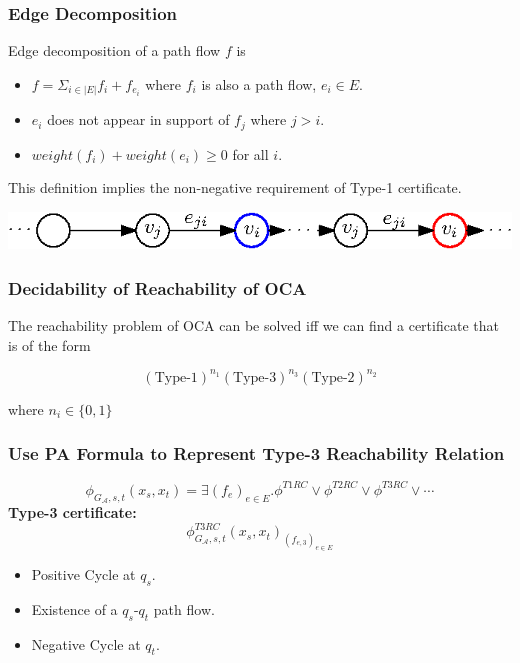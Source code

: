 \documentclass[11pt]{beamer}
\begin{document}
\begin{frame}\frametitle{Edge Decomposition}

\begin{definition}
Edge decomposition of a path flow $f$ is 
\begin{itemize}
\pause
\item $f = \Sigma_{i\in |E|} f_{i} + f_{e_i}$ where $f_{i}$ is also a path flow, $e_i\in E$.
\pause
\item $e_i$ does not appear in support of $f_{j}$ where $j > i$.
\pause
\item $weight(f_{i}) + weight(e_i) \ge 0$ for all $i$.
\end{itemize}

\end{definition}
\pause

This definition implies the non-negative requirement of Type-1 certificate.
\begin{center}
\includegraphics[scale=1.2]{edgeDecom.eps}
\end{center}
\end{frame}

\begin{frame}\frametitle{Decidability of Reachability of OCA}
\begin{theorem}[Haase]
The reachability problem of OCA can be solved iff we can find a certificate that is of the form

\[(\text{Type-1})^{n_1}(\text{Type-3})^{n_3}(\text{Type-2})^{n_2}\]

where $n_i\in \{0,1\}$
\end{theorem}
\end{frame}

	

\begin{frame}\frametitle{Use PA Formula to Represent Type-3 Reachability Relation}
\[\phi_{G_{\mathcal{A}}, s, t}(x_s, x_t) =\exists (f_e)_{e\in E}. \phi^{T1RC} \vee \phi^{T2RC} \vee \phi^{T3RC} \vee \cdots \]
\textbf{Type-3 certificate:}
\[\phi^{T3RC}_{G_\mathcal{A}, s, t}(x_s, x_t)_{ (f_{e,3})_{e\in E}} \]
\begin{itemize}
\item Positive Cycle at $q_s$.
\item Existence of a $q_s$-$q_t$ path flow.
\item Negative Cycle at $q_t$.
\end{itemize}
\end{frame}
\end{document}
